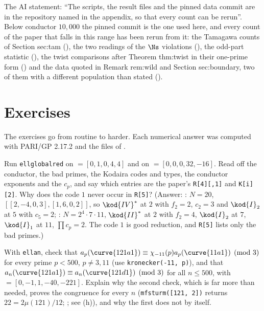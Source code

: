 \begin{sloppypar}
\begin{paperlink}\label{pl:computation:reproducibility}
The AI statement: ``The scripts, the result files and the pinned data commit are in the repository named in the appendix, so that every count
can be rerun''. Below conductor $10{,}000$ the pinned commit is the one used here, and every count of the paper that falls in this range has been
rerun from it: the Tamagawa counts of Section sec:tam (), the two readings of the $\Ns$ violations
(), the odd-part statistic (), the twist comparisons after Theorem thm:twist in their one-prime form
() and the data quoted in Remark rem:wild and Section sec:boundary, two of them with a different population than stated
().
\end{paperlink}
\section{Exercises}\label{sec:computation:exercises}

The exercises go from routine to harder. Each numerical answer was computed with PARI/GP 2.17.2 and the files of .

\begin{exercise}\label{exer:computation:globalred}
Run \texttt{ellglobalred} on  $=[0,1,0,4,4]$ and on  $=[0,0,0,32,-16]$. Read off the conductor, the bad primes, the Kodaira codes and
types, the conductor exponents and the $c_p$, and say which entries are the paper's \texttt{R[4][,1]} and \texttt{K[i][2]}. Why does the code $1$ never
occur in \texttt{R[5]}? (Answer: : $N=20$, $[[2,-4,0,3],[1,6,0,2]]$, so $\kod{IV}^*$ at $2$ with $f_2=2$, $c_2=3$ and $\kod{I}_2$ at $5$ with $c_5=2$;
: $N=2^4\cdot7\cdot11$, $\kod{II}^*$ at $2$ with $f_2=4$, $\kod{I}_2$ at $7$, $\kod{I}_1$ at $11$, $\prod c_p=2$. The code $1$ is good reduction, and
\texttt{R[5]} lists only the bad primes.)
\end{exercise}

\begin{exercise}\label{exer:computation:sturm}
With \texttt{ellan}, check that $a_p(\curve{121a1})\equiv\chi_{-11}(p)a_p(\curve{11a1})\pmod3$ for every prime $p<500$, $p\ne3,11$ (use \texttt{kronecker(-11, p)}),
and that $a_n(\curve{121a1})\equiv a_n(\curve{121d1})\pmod3$ for all $n\le500$, with  $=[0,-1,1,-40,-221]$. Explain why the second check, which is far
more than needed, proves the congruence for every $n$ (\texttt{mfsturm([121, 2])} returns $22=2\mu(121)/12$; ; see (h)), and why the first does not by
itself.
\end{exercise}


\end{sloppypar}
